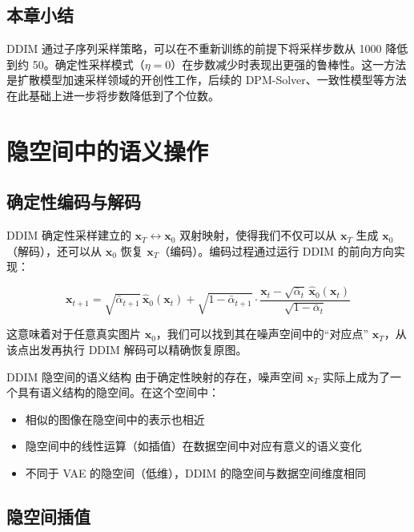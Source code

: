 \documentclass[a4paper]{article}
\begin{document}
\subsection{本章小结}

DDIM 通过子序列采样策略，可以在不重新训练的前提下将采样步数从 1000 降低到约 50。确定性采样模式（$\eta=0$）在步数减少时表现出更强的鲁棒性。这一方法是扩散模型加速采样领域的开创性工作，后续的 DPM-Solver、一致性模型等方法在此基础上进一步将步数降低到了个位数。


\section{隐空间中的语义操作}

\subsection{确定性编码与解码}

DDIM 确定性采样建立的 $\mathbf{x}_T \leftrightarrow \mathbf{x}_0$ 双射映射，使得我们不仅可以从 $\mathbf{x}_T$ 生成 $\mathbf{x}_0$（解码），还可以从 $\mathbf{x}_0$ 恢复 $\mathbf{x}_T$（编码）。编码过程通过运行 DDIM 的前向方向实现：

$$
\mathbf{x}_{t+1} = \sqrt{\bar{\alpha}_{t+1}}\,\hat{\mathbf{x}}_0(\mathbf{x}_t) + \sqrt{1-\bar{\alpha}_{t+1}}\cdot\frac{\mathbf{x}_t - \sqrt{\bar{\alpha}_t}\,\hat{\mathbf{x}}_0(\mathbf{x}_t)}{\sqrt{1-\bar{\alpha}_t}}
$$

这意味着对于任意真实图片 $\mathbf{x}_0$，我们可以找到其在噪声空间中的``对应点'' $\mathbf{x}_T$，从该点出发再执行 DDIM 解码可以精确恢复原图。

\begin{importantbox}{DDIM 隐空间的语义结构}
由于确定性映射的存在，噪声空间 $\mathbf{x}_T$ 实际上成为了一个具有语义结构的隐空间。在这个空间中：
\begin{itemize}
    \item 相似的图像在隐空间中的表示也相近
    \item 隐空间中的线性运算（如插值）在数据空间中对应有意义的语义变化
    \item 不同于 VAE 的隐空间（低维），DDIM 的隐空间与数据空间维度相同
\end{itemize}
\end{importantbox}

\subsection{隐空间插值}
\end{document}
